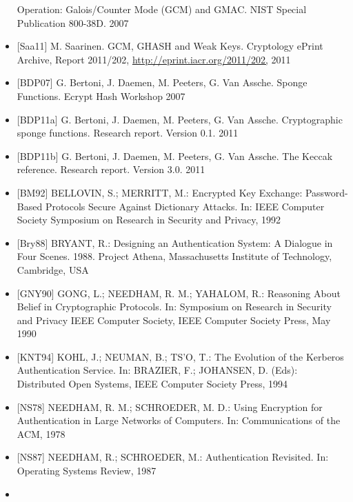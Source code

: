\documentclass[a4paper]{article}
\begin{document}
\begin{multicols}{3}
\begin{itemize}
              Operation: Galois/Counter Mode (GCM) and GMAC. NIST Special
              Publication 800-38D. 2007
        \item
              {[}Saa11{]} M. Saarinen. GCM, GHASH and Weak Keys. Cryptology ePrint
              Archive, Report 2011/202,
              \href{http://eprint.iacr.org/2011/202,}{http://eprint.iacr.org/2011/202,}
              2011
        \item
              {[}BDP07{]} G. Bertoni, J. Daemen, M. Peeters, G. Van Assche. Sponge
              Functions. Ecrypt Hash Workshop 2007
        \item
              {[}BDP11a{]} G. Bertoni, J. Daemen, M. Peeters, G. Van Assche.
              Cryptographic sponge functions. Research report. Version 0.1. 2011
        \item
              {[}BDP11b{]} G. Bertoni, J. Daemen, M. Peeters, G. Van Assche. The
              Keccak reference. Research report. Version 3.0. 2011
        \item
              {[}BM92{]} BELLOVIN, S.; MERRITT, M.: Encrypted Key Exchange:
              Password-Based Protocols Secure Against Dictionary Attacks. In: IEEE
              Computer Society Symposium on Research in Security and Privacy, 1992
        \item
              {[}Bry88{]} BRYANT, R.: Designing an Authentication System: A Dialogue
              in Four Scenes. 1988. Project Athena, Massachusetts Institute of
              Technology, Cambridge, USA
        \item
              {[}GNY90{]} GONG, L.; NEEDHAM, R. M.; YAHALOM, R.: Reasoning About
              Belief in Cryptographic Protocols. In: Symposium on Research in
              Security and Privacy IEEE Computer Society, IEEE Computer Society
              Press, May 1990
        \item
              {[}KNT94{]} KOHL, J.; NEUMAN, B.; TS'O, T.: The Evolution of the
              Kerberos Authentication Service. In: BRAZIER, F.; JOHANSEN, D. (Eds):
              Distributed Open Systems, IEEE Computer Society Press, 1994
        \item
              {[}NS78{]} NEEDHAM, R. M.; SCHROEDER, M. D.: Using Encryption for
              Authentication in Large Networks of Computers. In: Communications of
              the ACM, 1978
        \item
              {[}NS87{]} NEEDHAM, R.; SCHROEDER, M.: Authentication Revisited. In:
              Operating Systems Review, 1987
        \item

\end{itemize}
\end{multicols}
\end{document}
